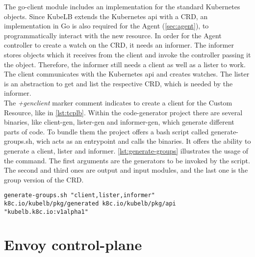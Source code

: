 The go-client module includes an implementation for the standard Kubernetes objects.
Since KubeLB extends the Kubernetes api with a CRD, an implementation in Go is also required for the Agent (\autoref{sec:agent}), to programmatically interact with the new resource.
In order for the Agent controller to create a watch on the CRD, it needs an informer.
The informer stores objects which it receives from the client and invoke the controller passing it the object.
Therefore, the informer still needs a client as well as a lister to work.
The client communicates with the Kubernetes api and creates watches.
The lister is an abstraction to get and list the respective CRD, which is needed by the informer.
\\
The \textit{+genclient} marker comment indicates to create a client for the Custom Resource, like in \autoref{lst:tcplb}.
Within the code-generator project there are several binaries, like client-gen, lister-gen and informer-gen, which generate different parts of code.
To bundle them the project offers a bash script called generate-groups.sh, wich acts as an entrypoint and calls the binaries.
It offers the ability to generate a client, lister and informer.
\autoref{lst:generate-groups} illustrates the usage of the command.
The first arguments are the generators to be invoked by the script.
The second and third ones are output and input modules, and the last one is the group version of the CRD.

\begin{lstlisting}[numbers=none, caption={Generate client, informer and lister with code-generator}, label={lst:generate-groups}]
	generate-groups.sh "client,lister,informer" k8c.io/kubelb/pkg/generated k8c.io/kubelb/pkg/api "kubelb.k8c.io:v1alpha1"
\end{lstlisting}

\section{Envoy control-plane}\label{sec:envoy-control-plane}

